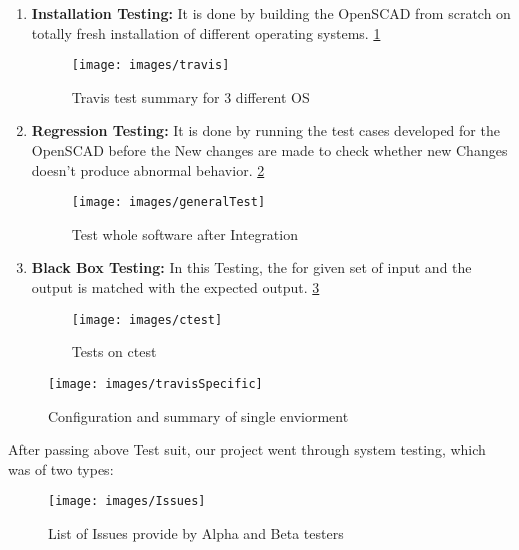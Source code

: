  \begin{enumerate}
     \item \textbf{Installation Testing:} It is done by building the OpenSCAD from scratch on totally fresh installation of different operating systems. \ref{fig:travis}
   
     \begin{figure}
         \centering
         \texttt{[image: images/travis]}
         \caption{Travis test summary for 3 different OS }
         \label{fig:travis}
     \end{figure}
   
     \item \textbf{Regression Testing:} It is done by running the test cases developed for the OpenSCAD before the New changes are made to check whether new Changes doesn't produce abnormal behavior. \ref{fig:generalTest}
   
     \begin{figure}
         \centering
         \texttt{[image: images/generalTest]}
         \caption{Test whole software after Integration}
         \label{fig:generalTest}
     \end{figure}
   
     \item \textbf{Black Box Testing:} In this Testing, the for given set of input and the output is matched with the expected output. \ref{fig:ctest}
   
     \begin{figure}
         \centering
         \texttt{[image: images/ctest]}
         \caption{Tests on ctest}
         \label{fig:ctest}
     \end{figure}
   
 \end{enumerate}

\begin{figure}
    \centering
    \texttt{[image: images/travisSpecific]}
    \caption{Configuration and summary of single enviorment}
    \label{fig:travisSpecific}
\end{figure}
 
After passing above Test suit, our project went through system testing, which was of two types:
\begin{figure}
\centering
\texttt{[image: images/Issues]}
\caption{List of Issues provide by Alpha and Beta testers}
\label{fig:Issues}
\end{figure}

